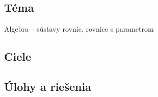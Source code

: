 
\subsection*{Téma}
Algebra -- sústavy rovníc, rovnice s parametrom

\subsection*{Ciele}

\subsection*{Úlohy a riešenia} 











%

%